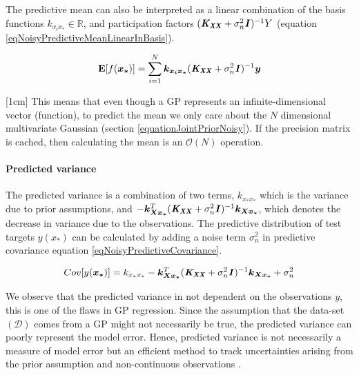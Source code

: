 The predictive mean can also be interpreted as a linear combination of the basis functions $k_{x_{i}x_{*}} \in \mathbb{R}$, and participation factors $( \bm{\mathit{K_{XX}}} + \sigma^{2}_{n}\bm{\mathit{I}})^{-1}Y$ (equation \ref{eqNoisyPredictiveMeanLinearInBasis}). 

  \begin{equation}\label{eqNoisyPredictiveMeanLinearInBasis}
  \mathbf{E}[f(\boldsymbol{x_{*}})] = \sum_{i = 1}^{N} \boldsymbol{k_{x_{i}x_{*}}}( \bm{\mathit{K_{XX}}} + \sigma^{2}_{n}\bm{\mathit{I}})^{-1} \boldsymbol{y}
  \end{equation}

[1cm]  
This means that even though a GP represents an infinite-dimensional vector (function), to predict the mean we only care about the $N$ dimensional multivariate Gaussian (section \ref{equationJointPriorNoisy}). If the precision matrix is cached, then calculating the mean is an $\mathcal{O}\left ( N \right )$ operation.

\paragraph{Predicted variance}
The predicted variance is a combination of two terms, $k_{x_{*}x_{*}}$ which is the variance due to prior assumptions, and $- \boldsymbol{k_{Xx_{*}}}^{T}( \bm{\mathit{K_{XX}}} + \sigma^{2}_{n}\bm{\mathit{I}} )^{-1} \boldsymbol{k_{Xx_{*}}}$, which denotes the decrease in variance due to the observations. The predictive distribution of test targets $y(x_{*})$ can be calculated by adding a noise term $\sigma^{2}_{n}$ in predictive covariance equation \ref{eqNoisyPredictiveCovariance}. 

  \begin{equation}\label{eqNoisyPredictiveCovarianceOnNoisyTarget}
	Cov[y(\boldsymbol{x_{*}})] = k_{x_{*}x_{*}} - \boldsymbol{k_{Xx_{*}}}^{T}( \bm{\mathit{K_{XX}}} + \sigma^{2}_{n}\bm{\mathit{I}} )^{-1} \boldsymbol{k_{Xx_{*}}} + \sigma_{n}^{2}
  \end{equation}
  
We observe that the predicted variance in not dependent on the observations $y$, this is one of the flaws in GP regression. Since the assumption that the data-set $(\mathcal{D})$ comes from a GP might not necessarily be true, the predicted variance can poorly represent the model error. Hence, predicted variance is not necessarily a measure of model error but an efficient method to track uncertainties arising from the prior assumption and non-continuous observations \cite{shah2014student}.


